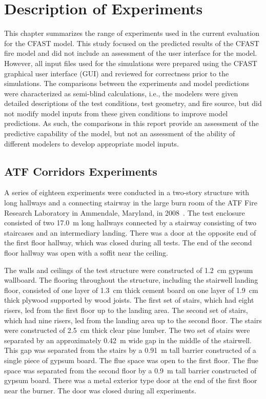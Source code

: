 \chapter{Description of Experiments}

\label{Experiment_Chapter}

This chapter summarizes the range of experiments used in the current evaluation for the CFAST model. This study focused on the predicted results of the CFAST fire model and did not include an assessment of the user interface for the model.  However, all input files used for the simulations were prepared using the CFAST graphical user interface (GUI) and reviewed for correctness prior to the simulations.  The comparisons between the experiments and model predictions were characterized as semi-blind calculations, i.e., the modelers were given detailed descriptions of the test conditions, test geometry, and fire source, but did not modify model inputs from these given conditions to improve model predictions.  As such, the comparisons in this report provide an assessment of the predictive capability of the model, but not an assessment of the ability of different modelers to develop appropriate model inputs.

\section{ATF Corridors Experiments}

A series of eighteen experiments were conducted in a two-story structure with long hallways and a connecting stairway
in the large burn room of the ATF Fire Research Laboratory in Ammendale, Maryland, in 2008~\cite{Sheppard:Corridors}.
The test enclosure consisted of two 17.0~m long hallways connected by a
stairway consisting of two staircases and an intermediary landing.
There was a door at the opposite end of the first floor hallway, which was closed during all tests.
The end of the second floor hallway was open with a soffit near the ceiling.

The walls and ceilings of the test structure were constructed of 1.2~cm gypsum wallboard.
The flooring throughout the structure, including the stairwell landing floor, consisted of one layer of 1.3~cm thick cement board on one
layer of 1.9~cm thick plywood supported by wood joists. The first set of stairs, which had eight risers, led from the first floor up to the landing area.
The second set of stairs, which had nine risers, led from the landing area up to the second floor.
The stairs were constructed of 2.5~cm thick clear pine lumber. The two set of stairs were separated by an approximately 0.42~m wide gap in the middle of the stairwell.
This gap was separated from the stairs by a 0.91~m tall barrier constructed of a single piece of gypsum board.
The flue space was open to the first floor.  The flue space was separated from the second floor by a 0.9~m tall barrier constructed of gypsum board.
There was a metal exterior type door at the end of the first floor near the burner.  The door was closed during all experiments.

